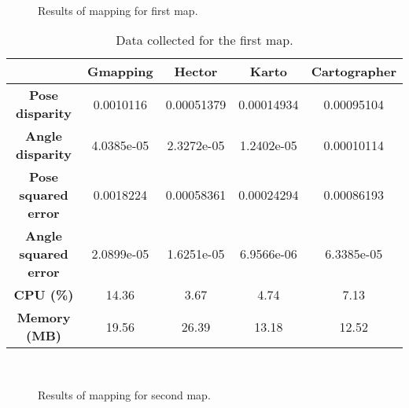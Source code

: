 \newpage
\begin{figure}[!ht]
     \centering
     \hspace{1cm}
     \\
     \hspace{1cm}
     \caption{Results of mapping for first map.}
     \label{fig:results1}
\end{figure}

\begin{table}[!ht]
\centering
\renewcommand*{\arraystretch}{1.1}
\begin{tabular}{c|c|c|c|c}
& \textbf{Gmapping} & \textbf{Hector} & \textbf{Karto} & \textbf{Cartographer} \\ \hline
\textbf{Pose disparity} & 0.0010116 & 0.00051379 & 0.00014934 & 0.00095104 \\
\textbf{Angle disparity} & 4.0385e-05 & 2.3272e-05 & 1.2402e-05 & 0.00010114 \\
\textbf{Pose squared error} & 0.0018224 & 0.00058361 & 0.00024294 & 0.00086193 \\
\textbf{Angle squared error} & 2.0899e-05 & 1.6251e-05 & 6.9566e-06 & 6.3385e-05 \\
\textbf{CPU (\%)} & 14.36 & 3.67 & 4.74 & 7.13 \\
\textbf{Memory (MB)} & 19.56 & 26.39 & 13.18 & 12.52 \\ \hline
\end{tabular}
\caption{Data collected for the first map.}
\label{tab:results1}
\end{table}


\begin{figure}[!ht]
     \centering
     \hspace{1cm}
     \\
     \hspace{1cm}
     \caption{Results of mapping for second map.}
     \label{fig:results2}
\end{figure}

